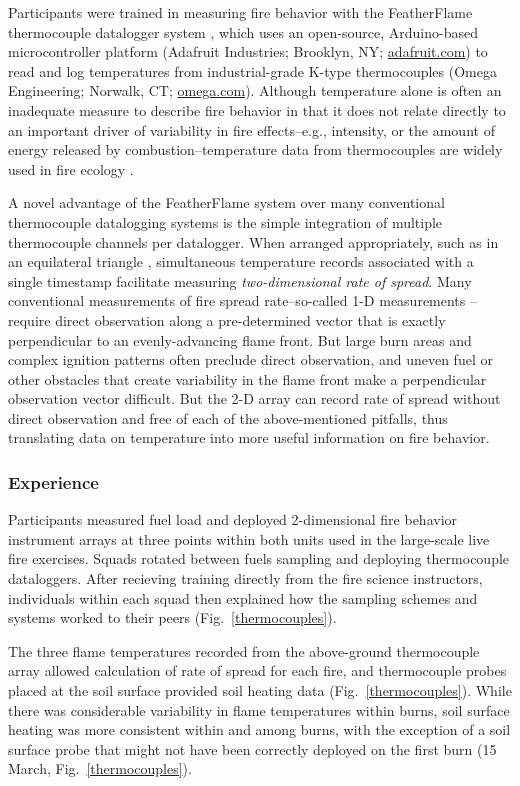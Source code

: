 \documentclass[fire,article,submit,moreauthors,pdftex]{Definitions/mdpi}
\begin{document}
Participants were trained in measuring fire behavior with the FeatherFlame thermocouple datalogger system \citep{mcgranahan2021b}, which uses an open-source, Arduino-based microcontroller platform (Adafruit Industries; Brooklyn, NY; \href{https://adafruit.com}{adafruit.com}) to read and log temperatures from industrial-grade K-type thermocouples (Omega Engineering; Norwalk, CT; \href{https://omega.com}{omega.com}).
Although temperature alone is often an inadequate measure to describe fire behavior in that it does not relate directly to an important driver of variability in fire effects--e.g., intensity, or the amount of energy released by combustion--temperature data from thermocouples are widely used in fire ecology \citep{mcgranahan2020}.

A novel advantage of the FeatherFlame system over many conventional thermocouple datalogging systems is the simple integration of multiple thermocouple channels per datalogger.
When arranged appropriately, such as in an equilateral triangle \citep{simard1984}, simultaneous temperature records associated with a single timestamp facilitate measuring \emph{two-dimensional rate of spread}.
Many conventional measurements of fire spread rate--so-called 1-D measurements \citep{finney2021}--require direct observation along a pre-determined vector that is exactly perpendicular to an evenly-advancing flame front.
But large burn areas and complex ignition patterns often preclude direct observation, and uneven fuel or other obstacles that create variability in the flame front make a perpendicular observation vector difficult.
But the 2-D array can record rate of spread without direct observation and free of each of the above-mentioned pitfalls, thus translating data on temperature into more useful information on fire behavior.

\subsubsection{Experience}

Participants measured fuel load and deployed 2-dimensional fire behavior instrument arrays at three points within both units used in the large-scale live fire exercises.
Squads rotated between fuels sampling and deploying thermocouple dataloggers.
After recieving training directly from the fire science instructors, individuals within each squad then explained how the sampling schemes and systems worked to their peers (Fig.~\ref{thermocouples}).

The three flame temperatures recorded from the above-ground thermocouple array allowed calculation of rate of spread for each fire, and thermocouple probes placed at the soil surface provided soil heating data (Fig.~\ref{thermocouples}).
While there was considerable variability in flame temperatures within burns, soil surface heating was more consistent within and among burns, with the exception of a soil surface probe that might not have been correctly deployed on the first burn (15 March, Fig.~\ref{thermocouples}).
\end{document}

